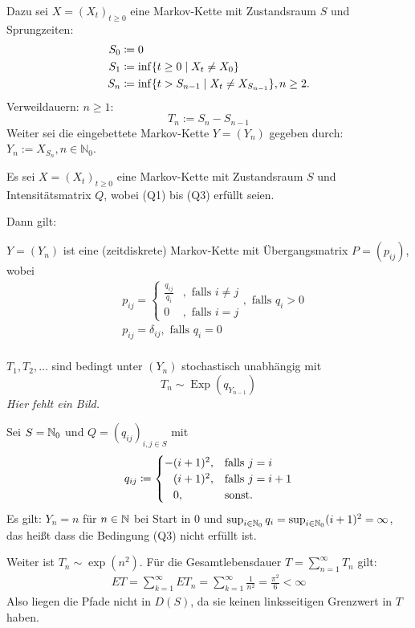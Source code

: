 \documentclass[a4paper,twoside,DIV15,BCOR12mm]{scrbook}
\begin{document}
  Dazu sei $X=(X_t)_{t\geq 0}$ eine Markov-Kette mit Zustandsraum $S$ und Sprungzeiten: 
  \begin{align*}
    S_0&\da0 \\
    S_1&\da\inf\{t\geq0\mid X_t\neq X_0\} \\
    S_n&\da\inf\{t>S_{n-1}\mid X_t\neq X_{S_{n-1}} \}, n\geq 2.
  \end{align*}
  Verweildauern: $n\geq 1$:
  \[
  T_n:=S_n-S_{n-1}
  \]
  Weiter sei die eingebettete Markov-Kette $Y=(Y_n)$ gegeben durch: $Y_n:=X_{S_n}, n\in\mathbb N_0$.
  \begin{satz}
    \label{satz8.5}
    Es sei $X=(X_t)_{t\geq0}$ eine Markov-Kette mit Zustandsraum $S$ und Intensitätsmatrix $Q$, 
    wobei (Q1) bis (Q3) erfüllt seien.

    Dann gilt:
    \begin{enuma}
    \item $Y=(Y_n)$ ist eine (zeitdiskrete) Markov-Kette mit Übergangsmatrix $P=(p_{ij})$, wobei
      \begin{align*}
	& p_{ij}=\begin{cases}
	\frac{q_{ij}}{q_i} & , \text{ falls } i\neq j \\
	0 & , \text{ falls } i=j
	\end{cases} , \text{ falls } q_i>0 \\
	& p_{ij}=\delta_{ij}, \text{ falls } q_i=0 \\
      \end{align*}
    \item $T_1,T_2,\dots$ sind bedingt unter $(Y_n)$ stochastisch unabhängig mit
      \[
      T_n\sim \operatorname{Exp}(q_{Y_{n-1}})
      \]
      \emph{Hier fehlt ein Bild.}
    \end{enuma}
  \end{satz}

\begin{beispiel}
Sei $S=\mathbb{N}_0$ und $Q=(q_{ij})_{i,j\in S}$ mit
\begin{align*}
q_{ij} \da 
\begin{cases}
-(i+1)^2, & \text{falls } j=i \\
\phantom - (i+1)^2, & \text{falls } j=i+1 \\
\phantom - 0, &\text{sonst.}
\end{cases}
\end{align*}
Es gilt: $Y_n=n$ für $n\in\mathbb{N}$ bei Start in 0 und $\sup_{i\in\mathbb{N}_0} q_i = \sup_{i\in \mathbb{N}_0} (i+1)^2 = \infty$, das heißt dass die Bedingung (Q3) nicht erfüllt ist.

Weiter ist $T_n\sim \exp(n^2)$. Für die Gesamtlebensdauer $T=\sum_{n=1}^\infty T_n$ gilt:
\begin{align*}
ET = \sum_{k=1}^\infty  E T_n = \sum_{k=1}^\infty \frac1{n^2} = \frac {\pi^2}6 < \infty
\end{align*}
Also liegen die Pfade nicht in $D(S)$, da sie keinen linksseitigen Grenzwert in $T$ haben.
\end{beispiel}
\end{document}
